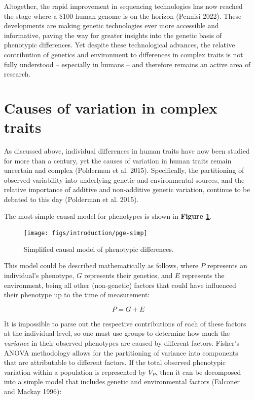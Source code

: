 \documentclass[
]{book}
\begin{document}
Altogether, the rapid improvement in sequencing technologies has now reached the stage where a \$100 human genome is on the horizon (Pennisi 2022). These developments are making genetic technologies ever more accessible and informative, paving the way for greater insights into the genetic basis of phenotypic differences. Yet despite these technological advances, the relative contribution of genetics and environment to differences in complex traits is not fully understood -- especially in humans -- and therefore remains an active area of research.

\hypertarget{causes-of-variation-in-complex-traits}{%
\section{Causes of variation in complex traits}\label{causes-of-variation-in-complex-traits}}

As discussed above, individual differences in human traits have now been studied for more than a century, yet the causes of variation in human traits remain uncertain and complex (Polderman et al. 2015). Specifically, the partitioning of observed variability into underlying genetic and environmental sources, and the relative importance of additive and non-additive genetic variation, continue to be debated to this day (Polderman et al. 2015).

The most simple causal model for phenotypes is shown in \textbf{Figure \ref{fig:pge-simp}}.



\begin{figure}

{\centering \texttt{[image: figs/introduction/pge-simp]} 

}

\caption{Simplified causal model of phenotypic differences.}\label{fig:pge-simp}
\end{figure}

This model could be described mathematically as follows, where \(P\) represents an individual's phenotype, \(G\) represents their genetics, and \(E\) represents the environment, being all other (non-genetic) factors that could have influenced their phenotype up to the time of measurement:

\begin{equation}
P = G + E \label{eq:pge-simp}
\end{equation}

It is impossible to parse out the respective contributions of each of these factors at the individual level, so one must use groups to determine how much the \emph{variance} in their observed phenotypes are caused by different factors. Fisher's ANOVA methodology allows for the partitioning of variance into components that are attributable to different factors. If the total observed phenotypic variation within a population is represented by \(V_{P}\), then it can be decomposed into a simple model that includes genetic and environmental factors (Falconer and Mackay 1996):
\end{document}
